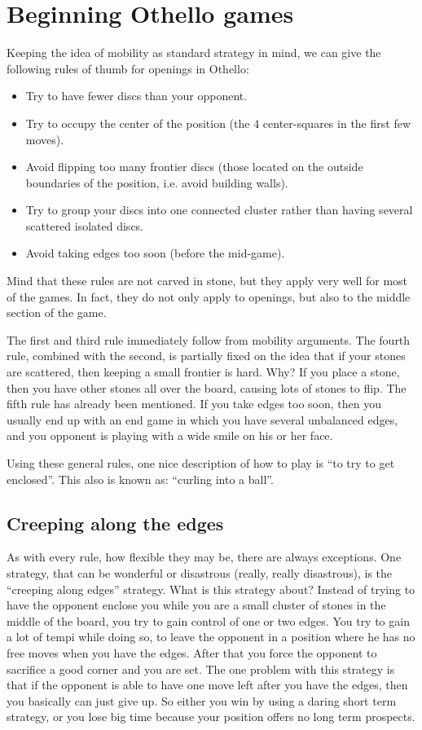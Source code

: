 \documentclass[12pt,twoside]{report}
\begin{document}
\section{Beginning Othello games}
Keeping the idea of mobility as standard strategy in mind, we can
give the following rules of thumb for openings in Othello:

\begin{itemize}
\item Try to have fewer discs than your opponent.
\item Try to occupy the center of the position (the 4 center-squares in the first few moves).
\item Avoid flipping too many frontier discs (those located on the outside boundaries of the position, i.e. avoid
    building walls).
\item Try to group your discs into one connected cluster rather than having several scattered isolated discs.
\item Avoid taking edges too soon (before the mid-game).
\end{itemize}

Mind that these rules are not carved in stone, but they apply very
well for most of the games. In fact, they do not only apply to
openings, but also to the middle section of the game.

The first and third rule immediately follow from mobility
arguments. The fourth rule, combined with the second, is partially fixed on the
idea that if your stones are scattered, then keeping a small
frontier is hard. Why? If you place a stone, then you have other
stones all over the board, causing lots of stones to flip. The
fifth rule has already been mentioned. If you take edges too soon,
then you usually end up with an end game in which you have several
unbalanced edges, and you opponent is playing with a wide smile on
his or her face.

Using these general rules, one nice description of how to play is
``to try to get enclosed''. This also is known as: ``curling into
a ball''.

\subsection{Creeping along the edges}
As with every rule, how flexible they may be, there are always
exceptions. One strategy, that can be wonderful or disastrous
(really, really disastrous), is the ``creeping along edges''
strategy. What is this strategy about? Instead of trying to have
the opponent enclose you while you are a small cluster of stones
in the middle of the board, you try to gain control of one or two
edges. You try to gain a lot of tempi while doing so, to leave
the opponent in a position where he has no free moves when you
have the edges. After that you force the opponent to sacrifice a
good corner and you are set. The one problem with this strategy is
that if the opponent is able to have one move left after you have
the edges, then you basically can just give up. So either you win
by using a daring short term strategy, or you lose big time because
your position offers no long term prospects.
\end{document}
